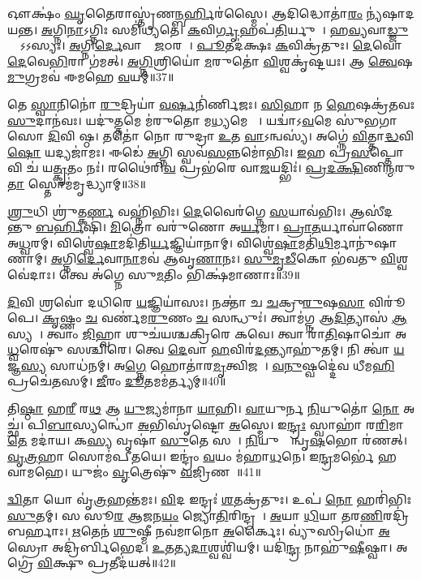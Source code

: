 𑌔𑌕𑍍𑌷𑌂॑ \ul{𑌘𑍃}𑌤𑍈𑌰𑌾𑌸𑍍𑌤𑍃॑𑌣\ul{𑌨𑍍𑌬}\ul{𑌰𑍍}𑌹𑌿𑌰॑𑌸𑍍𑌮𑍈।
𑌆𑌦𑌿𑌦𑍍𑌧𑍋𑌤𑌾॑\ul{𑌰𑌂} 𑌨𑍍𑌯॑𑌷𑌾𑌦𑌯𑌨𑍍𑌤।
\ul{𑌅}𑌗𑍍𑌨𑌿\ul{𑌨𑌾}\-𑌽𑌗𑍍𑌨𑌿𑌃 𑌸𑌮𑌿॑𑌧𑍍𑌯𑌤𑍇।
\ul{𑌕}𑌵𑌿\ul{𑌰𑍍𑌗𑍃}𑌹𑌪॑\ul{𑌤𑌿}𑌰𑍍𑌯𑍁𑌵𑌾᳚।
\ul{𑌹}\ul{𑌵𑍍𑌯}𑌵𑌾\ul{𑌡𑍍𑌜𑍁}𑌹𑍍𑌵𑌾᳚𑌽𑌽𑌸𑍍𑌯𑌃।
\ul{𑌅}𑌗𑍍𑌨𑌿\ul{𑌰𑍍𑌦𑍇}𑌵𑌾𑌨𑌾𑌂᳚ \ul{𑌜}𑌠𑌰𑌮𑍍᳚।
\ul{𑌪𑍂}𑌤𑌦॑𑌕𑍍𑌷𑌃 \ul{𑌕}𑌵𑌿𑌕𑍍𑌰॑𑌤𑍁𑌃।
\ul{𑌦𑍇}𑌵𑍋 \ul{𑌦𑍇}𑌵𑍇\ul{𑌭𑌿}𑌰𑌾 𑌗॑𑌮𑌤𑍍।
\ul{𑌅}\ul{𑌗𑍍𑌨𑌿}𑌶𑍍𑌰𑌿𑌯𑍋॑ \ul{𑌮}𑌰𑍁𑌤𑍋॑ \ul{𑌵𑌿}𑌶𑍍𑌵𑌕𑍃॑𑌷𑍍𑌟𑌯𑌃।
𑌆 \ul{𑌤𑍍𑌵𑍇}𑌷\ul{𑌮𑍁}𑌗𑍍𑌰𑌮𑌵॑ 𑌈𑌮𑌹𑍇 \ul{𑌵}𑌯𑌮𑍍॥37॥

𑌤𑍇 \ul{𑌸𑍍𑌵𑌾}𑌨𑌿𑌨𑍋॑ \ul{𑌰𑍁}𑌦𑍍𑌰𑌿𑌯𑌾॑ \ul{𑌵}\ul{𑌰𑍍}𑌷𑌨𑌿॑𑌰𑍍𑌣𑌿𑌜𑌃।
\ul{𑌸𑌿}\ul{}𑌹𑌾 𑌨 \ul{𑌹𑍇}𑌷𑌕𑍍𑌰॑𑌤𑌵𑌃 \ul{𑌸𑍁}𑌦𑌾𑌨॑𑌵𑌃।
𑌯𑌦𑍁॑\ul{𑌤𑍍𑌤}𑌮𑍇 𑌮॑𑌰𑍁𑌤𑍋 𑌮\ul{𑌧𑍍𑌯}𑌮𑍇 𑌵𑌾᳚।
𑌯𑌦𑍍𑌵𑌾॑\-𑌽\ul{𑌵}𑌮𑍇 𑌸𑍁॑𑌭𑌗𑌾𑌸𑍋 \ul{𑌦𑌿}𑌵𑌿 𑌷𑍍𑌠।
𑌤𑌤𑍋॑ 𑌨𑍋 𑌰𑍁𑌦𑍍𑌰𑌾 \ul{𑌉}𑌤 \ul{𑌵𑌾}\-𑌽𑌨𑍍𑌵𑌸𑍍𑌯॑।
𑌅𑌗𑍍𑌨𑍇॑ \ul{𑌵𑌿}𑌤𑍍𑌤𑌾\ul{𑌦𑍍𑌧}𑌵𑌿\ul{𑌷𑍋} 𑌯𑌦𑍍𑌯𑌜𑌾॑𑌮𑌃।
𑌈𑌡𑍇॑ \ul{𑌅}𑌗𑍍𑌨𑌿 𑌸𑍍𑌵𑌵॑\ul{𑌸}𑌨𑍍𑌨𑌮𑍋॑𑌭𑌿𑌃।
\ul{𑌇}𑌹 𑌪𑍍𑌰॑\ul{𑌸}𑌪𑍍𑌤𑍋 𑌵𑌿 𑌚॑ 𑌯\ul{𑌤𑍍𑌕𑍃}𑌤𑌂 𑌨𑌃॑।
𑌰𑌥𑍈॑𑌰𑌿\ul{𑌵} 𑌪𑍍𑌰𑌭॑𑌰𑍇 𑌵𑌾\ul{𑌜}𑌯𑌦𑍍𑌭𑌿𑌃॑।
\ul{𑌪𑍍𑌰}\ul{𑌦}\ul{𑌕𑍍𑌷𑌿}𑌣𑌿\ul{𑌨𑍍𑌮}𑌰𑍁\ul{𑌤𑌾}\ul{} 𑌸𑍍𑌤𑍋𑌮॑𑌮𑍃𑌦𑍍𑌧𑍍𑌯𑌾𑌮𑍍॥38॥

\ul{𑌶𑍍𑌰𑍁}𑌧𑌿 𑌶𑍍𑌰𑍁॑𑌤𑍍𑌕\ul{𑌰𑍍𑌣} 𑌵𑌹𑍍𑌨𑌿॑𑌭𑌿𑌃।
\ul{𑌦𑍇}𑌵𑍈𑌰॑𑌗𑍍𑌨𑍇 \ul{𑌸}𑌯𑌾𑌵॑𑌭𑌿𑌃।
𑌆𑌸𑍀॑𑌦𑌨𑍍𑌤𑍁 \ul{𑌬}\ul{𑌰𑍍}𑌹𑌿𑌷𑌿॑।
\ul{𑌮𑌿}𑌤𑍍𑌰𑍋 𑌵𑌰𑍁॑𑌣𑍋 𑌅\ul{𑌰𑍍𑌯}𑌮𑌾।
\ul{𑌪𑍍𑌰𑌾}\ul{𑌤}𑌰𑍍𑌯𑌾𑌵𑌾॑𑌣𑍋 𑌅\ul{𑌧𑍍𑌵}𑌰𑌮𑍍।
𑌵𑌿𑌶𑍍𑌵𑍇॑\ul{𑌷𑌾}𑌮𑌦𑌿॑𑌤𑌿\ul{𑌰𑍍𑌯}𑌜𑍍𑌞𑌿𑌯𑌾॑𑌨𑌾𑌮𑍍।
𑌵𑌿𑌶𑍍𑌵𑍇॑\ul{𑌷𑌾}𑌮𑌤𑌿॑\ul{𑌥𑌿}𑌰𑍍𑌮𑌾𑌨𑍁॑𑌷𑌾𑌣𑌾𑌮𑍍।
\ul{𑌅}𑌗𑍍𑌨𑌿\ul{𑌰𑍍𑌦𑍇}𑌵𑌾\ul{𑌨𑌾}𑌮𑌵॑ 𑌆𑌵𑍃\ul{𑌣𑌾}𑌨𑌃।
\ul{𑌸𑍁}\ul{𑌮𑍃}\ul{𑌡𑍀}𑌕𑍋 𑌭॑𑌵𑌤𑍁 \ul{𑌵𑌿}𑌶𑍍𑌵𑌵𑍇॑𑌦𑌾𑌃।
𑌤𑍍𑌵𑍇 𑌅॑𑌗𑍍𑌨𑍇 𑌸𑍁\ul{𑌮}𑌤𑌿𑌂 𑌭𑌿𑌕𑍍𑌷॑𑌮𑌾𑌣𑌾𑌃॥39॥

\ul{𑌦𑌿}𑌵𑌿 𑌶𑍍𑌰𑌵𑍋॑ 𑌦𑌧𑌿𑌰𑍇 \ul{𑌯}𑌜𑍍𑌞𑌿𑌯𑌾॑𑌸𑌃।
𑌨𑌕𑍍𑌤𑌾॑ 𑌚 \ul{𑌚}𑌕𑍍𑌰𑍁\ul{𑌰𑍁}𑌷\ul{𑌸𑌾} 𑌵𑌿𑌰𑍂॑𑌪𑍇।
\ul{𑌕𑍃}𑌷𑍍𑌣𑌂 \ul{𑌚} 𑌵𑌰𑍍𑌣॑𑌮\ul{𑌰𑍁}𑌣𑌂 \ul{𑌚} 𑌸𑌨𑍍𑌧𑍁𑌃॑।
𑌤𑍍𑌵𑌾𑌮॑𑌗𑍍𑌨 𑌆\ul{𑌦𑌿}𑌤𑍍𑌯𑌾𑌸॑ \ul{𑌆}𑌸𑍍𑌯𑌮𑍍᳚।
𑌤𑍍𑌵𑌾𑌂 \ul{𑌜𑌿}𑌹𑍍𑌵𑌾 𑌶𑍁𑌚॑𑌯𑌶𑍍𑌚𑌕𑍍𑌰𑌿𑌰𑍇 𑌕𑌵𑍇।
𑌤𑍍𑌵𑌾 𑌰𑌾॑\ul{𑌤𑌿}𑌷𑌾𑌚𑍋॑ 𑌅\ul{𑌧𑍍𑌵}𑌰𑍇𑌷𑍁॑ 𑌸𑌶𑍍𑌚𑌿𑌰𑍇।
𑌤𑍍𑌵𑍇 \ul{𑌦𑍇}𑌵𑌾 \ul{𑌹}𑌵𑌿𑌰॑\ul{𑌦}𑌨𑍍𑌤𑍍𑌯𑌾𑌹𑍁॑𑌤𑌮𑍍।
𑌨𑌿 𑌤𑍍𑌵𑌾॑ \ul{𑌯}𑌜𑍍𑌞\ul{𑌸𑍍𑌯} 𑌸𑌾𑌧॑𑌨𑌮𑍍।
𑌅\ul{𑌗𑍍𑌨𑍇} 𑌹𑍋𑌤𑌾॑𑌰\ul{𑌮𑍃}𑌤𑍍𑌵𑌿𑌜𑌮𑍍᳚।
\ul{𑌵}\ul{𑌨𑍁}𑌷𑍍𑌵𑌦𑍍𑌦𑍇॑𑌵 𑌧𑍀𑌮\ul{𑌹𑌿} 𑌪𑍍𑌰𑌚𑍇॑𑌤𑌸𑌮𑍍।
\ul{𑌜𑍀}𑌰𑌂 \ul{𑌦𑍂}𑌤𑌮𑌮॑𑌰𑍍𑌤𑍍𑌯𑌮𑍍॥40॥\anuvakamend[\ul{𑌯}\ul{𑌜𑍍𑌞}\ul{𑌵𑌾}\ul{𑌹}\ul{𑌸𑌾}\ul{𑌸}\ul{𑌪}\ul{𑌰𑍍𑌯}\ul{𑌨𑍍𑌵}𑌯𑌮𑍃॑\ul{𑌦𑍍𑌧𑍍𑌯𑌾𑌂} 𑌭𑌿𑌕𑍍𑌷॑𑌮𑌾\ul{𑌣𑌾𑌃} 𑌪𑍍𑌰𑌚𑍇॑𑌤\ul{𑌸}𑌮𑍇𑌕𑌂॑ 𑌚]

𑌤𑌿\ul{𑌷𑍍𑌠𑌾} 𑌹\ul{𑌰𑍀} 𑌰\ul{𑌥} 𑌆 \ul{𑌯𑍁}𑌜𑍍𑌯𑌮𑌾॑𑌨𑌾 \ul{𑌯𑌾}𑌹𑌿।
\ul{𑌵𑌾}𑌯𑍁𑌰𑍍𑌨 \ul{𑌨𑌿}𑌯𑍁𑌤𑍋॑ \ul{𑌨𑍋} 𑌅𑌚𑍍𑌛॑।
𑌪𑌿\ul{𑌬𑌾}𑌸𑍍𑌯𑌨𑍍𑌧𑍋॑ \ul{𑌅}𑌭𑌿𑌸𑍃॑𑌷𑍍𑌟𑍋 \ul{𑌅}𑌸𑍍𑌮𑍇।
𑌇\ul{𑌨𑍍𑌦𑍍𑌰𑌃} 𑌸𑍍𑌵𑌾𑌹𑌾॑ 𑌰\ul{𑌰𑌿}𑌮𑌾 \ul{𑌤𑍇} 𑌮𑌦𑌾॑𑌯।
𑌕\ul{𑌸𑍍𑌯} 𑌵𑍃𑌷𑌾॑ \ul{𑌸𑍁}𑌤𑍇 𑌸𑌚𑌾᳚।
\ul{𑌨𑌿}𑌯𑍁𑌤𑍍𑌵𑌾᳚𑌨𑍍𑌵𑍃\ul{𑌷}𑌭𑍋 𑌰॑𑌣𑌤𑍍।
\ul{𑌵𑍃}\ul{𑌤𑍍𑌰}𑌹𑌾 𑌸𑍋𑌮॑𑌪𑍀𑌤𑌯𑍇।
𑌇𑌨𑍍𑌦𑍍𑌰𑌂॑ \ul{𑌵}𑌯𑌂 𑌮॑𑌹𑌾\ul{𑌧}𑌨𑍇।
𑌇\ul{𑌨𑍍𑌦𑍍𑌰}𑌮𑌰𑍍𑌭𑍇॑ 𑌹𑌵𑌾𑌮𑌹𑍇।
𑌯𑍁𑌜𑌂॑ \ul{𑌵𑍃}𑌤𑍍𑌰𑍇𑌷𑍁॑ \ul{𑌵}𑌜𑍍𑌰𑌿𑌣𑌮𑍍᳚॥41॥

\ul{𑌦𑍍𑌵𑌿}𑌤𑌾 𑌯𑍋 𑌵𑍃॑\ul{𑌤𑍍𑌰}𑌹𑌨𑍍𑌤॑𑌮𑌃।
\ul{𑌵𑌿}𑌦 𑌇𑌨𑍍𑌦𑍍𑌰𑌃॑ \ul{𑌶}𑌤𑌕𑍍𑌰॑𑌤𑍁𑌃।
𑌉𑌪॑ \ul{𑌨𑍋} 𑌹𑌰𑌿॑𑌭𑌿𑌃 \ul{𑌸𑍁}𑌤𑌮𑍍।
𑌸 𑌸𑍂\ul{𑌰} 𑌆\ul{𑌜}𑌨\ul{𑌯𑌂} 𑌜𑍍𑌯𑍋\ul{𑌤𑌿}𑌰𑌿𑌨𑍍𑌦𑍍𑌰𑌮𑍍᳚।
\ul{𑌅}𑌯𑌾 \ul{𑌧𑌿}𑌯𑌾 \ul{𑌤}𑌰\ul{𑌣𑌿}𑌰𑌦𑍍𑌰𑌿॑𑌬𑌰𑍍\mbox{}𑌹𑌾𑌃।
\ul{𑌋}𑌤𑍇𑌨॑ \ul{𑌶𑍁}𑌷𑍍𑌮𑍀 𑌨𑌵॑𑌮𑌾𑌨𑍋 \ul{𑌅}𑌰𑍍𑌕𑍈𑌃।
𑌵𑍍𑌯𑍁॑𑌸𑍍𑌰𑌿𑌧𑍋॑ \ul{𑌅}𑌸𑍍𑌰𑍋 𑌅𑌦𑍍𑌰𑌿॑𑌰𑍍𑌬𑌿𑌭𑍇𑌦।
\ul{𑌉}𑌤𑌤𑍍𑌯\ul{𑌦𑌾}𑌶𑍍𑌵𑌶𑍍𑌵𑌿॑𑌯𑌮𑍍।
𑌯𑌦𑌿॑\ul{𑌨𑍍𑌦𑍍𑌰} 𑌨𑌾𑌹𑍁॑\ul{𑌷𑍀}𑌷𑍍𑌵𑌾।
𑌅𑌗𑍍𑌰𑍇॑ \ul{𑌵𑌿}𑌕𑍍𑌷𑍁 𑌪𑍍𑌰𑌤𑍀𑌦॑𑌯𑌤𑍍॥42॥

